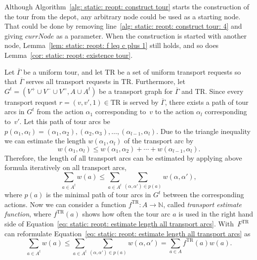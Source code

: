 \documentclass[english]{llncs}
\numberwithin{sublemma}{lemma}
\newcommand{\NN}{\ensuremath{\mathbb{N}}}
\newcommand{\tourd}{\ensuremath{\Gamma}}
\newcommand{\action}{\ensuremath{\alpha}}
\newcommand{\TR}{\mathrm{TR}}
\newcommand{\Vpick}{{V^+}}
\newcommand{\Vdrop}{{V^-}}
\newcommand{\Vbal}{{V^=}}
\begin{document}
\begin{remark} \label{rem: static: reopt: arbitrary start node}
  Although Algorithm~\ref{alg: static: reopt: construct tour} starts the construction of the tour from the depot, any arbitrary node could be used as a starting node.
  That could be done by removing line~\ref{alg: static: reopt: construct tour: 4} and giving $currNode$ as a parameter.
  When the construction is started with another node, Lemma~\ref{lem: static: reopt: f leq c plus 1} still holds, and so does Lemma~\ref{cor: static: reopt: existence tour}.
\end{remark}






Let $\overline{\tourd}$ be a uniform tour, and let $\TR$ be a set of uniform transport requests so that $\overline{\tourd}$ serves all transport requests in $\TR$.
Furthermore, let $G^t = (\Vpick \cup \Vdrop \cup \Vbal, A \cup A^t)$ be a transport graph for $\overline{\tourd}$ and $\TR$.
Since every transport request $r = (v, v', 1) \in \TR$ is served by $\overline{\tourd}$, there exists a path of tour arcs in $G^t$ from the action $\action_1$ corresponding to~$v$ to the action $\action_l$ corresponding to~$v'$.
Let this path of tour arcs be $p(\action_1, \action_l) = (\action_1, \action_2), (\action_2, \action_3), \dotsc, (\action_{l-1}, \action_l)$.
Due to the triangle inequality we can estimate the length $w(\action_1, \action_l)$ of the transport arc by
\[
  w(\action_1, \action_l) \leq w(\action_1, \action_2) + \dotsm + w(\action_{l-1}, \action_l).
\]
Therefore, the length of all transport arcs can be estimated by applying above formula iteratively on all transport arcs,
\begin{equation}\label{eq: static: reopt: estimate length all transport arcs}
 \sum_{a \in A^t} w(a) \leq \sum_{a \in A^t} \sum_{(\action, \action') \in p(a)} w(\action, \action'),
\end{equation}
where $p(a)$ is the minimal path of tour arcs in $G^t$ between the corresponding actions.
Now we can consider a function $f^{\TR} : A \to \NN$, called \emph{transport estimate function},
where $f^{\TR}(a)$ shows how often the tour arc $a$ is used in the right hand side of Equation~\eqref{eq: static: reopt: estimate length all transport arcs}.
With~$F^{\TR}$ can reformulate Equation~\eqref{eq: static: reopt: estimate length all transport arcs} as
\begin{equation}\label{eq: static: reopt: estimate length all transport arcs: fTR}
 \sum_{a \in A^t} w(a) \leq \sum_{a \in A^t} \sum_{(\action, \action') \in p(a)} w(\action, \action') = \sum_{a \in A} f^{\TR}(a) w(a).
\end{equation}
\end{document}
